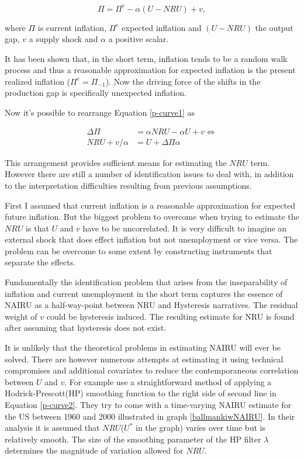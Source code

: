 \documentclass[12pt,a4paper,english]{article}
\begin{document}
\begin{equation}\label{p-curve1}
\Pi = \Pi^e - \alpha(U-NRU) + v,
\end{equation}

where $\Pi$ is current inflation, $\Pi^e$ expected inflation and $(U-NRU)$ the output gap, $v$ a supply shock and $\alpha$ a positive scalar.

It has been shown that, in the short term, inflation tends to be a random walk process and thus a reasonable approximation for expected inflation is the present realized inflation ($\Pi^e = \Pi_{-1}$). Now the driving force of the shifts in the production gap is specifically unexpected inflation. \citep{ball2000, barsky1987}

Now it's possible to rearrange Equation \ref{p-curve1}
as

\begin{equation}\label{p-curve2}
\begin{split}
\Delta \Pi &= \alpha NRU - \alpha U + v  \Leftrightarrow \\
NRU + v/\alpha &= U + \Delta \Pi \alpha
\end{split}
\end{equation}

This arrangement provides sufficient means for estimating the $NRU$ term.  However there are still a number of identification issues to deal with, in addition to the interpretation difficulties resulting from previous assumptions.

First I assumed that current inflation is a reasonable approximation for expected future inflation. But the biggest problem to overcome when trying to estimate the $NRU$ is that $U$ and $v$ have to be uncorrelated. It is very difficult to imagine an external shock that does effect inflation but not unemployment or vice versa. The problem can be overcome to some extent by constructing instruments that separate the effects.

Fundamentally the identification problem that arises from the inseparability of inflation and current unemployment in the short term captures the essence of NAIRU as a half-way-point between NRU and Hysteresis narratives. The residual weight of $v$ could be hysteresis induced. The resulting estimate for NRU is found after assuming that hysteresis does not exist.

It is unlikely that the theoretical problems in estimating NAIRU will ever be solved. There are however numerous attempts at estimating it using technical compromises and additional covariates to reduce the contemporaneous correlation between $U$ and $v$. For example \cite{ballmankiw2002} use a straightforward method of applying a Hodrick-Prescott(HP) smoothing function to the right side of second line in Equation \ref{p-curve2}. They try to come with a time-varying NAIRU estimate for the US between 1960 and 2000 illustrated in graph \ref{ballmankiwNAIRU}. In their analysis it is assumed that $NRU$($U^*$ in the graph) varies over time but is relatively smooth. The size of the smoothing parameter of the HP filter $\lambda$ determines the magnitude of variation allowed for $NRU$.
\end{document}
